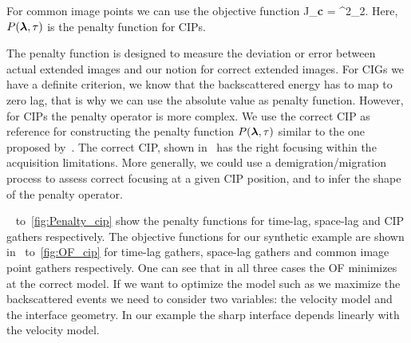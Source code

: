 For common image points we can use the objective function
\beq
J_{\bf c} =   ^2_2.
\eeq
%
Here, $P({\boldsymbol{\lambda}},\tau)$ is the penalty function for CIPs.

The penalty function is designed to measure the deviation or error between actual extended images and our notion for correct 
extended images. For CIGs we have a definite criterion, we know that the backscattered energy has to map
to zero lag, that is why we can use the absolute value as penalty function. However, for CIPs the 
penalty operator is more complex. We use the correct CIP as reference for constructing the penalty function $P({\boldsymbol{\lambda}},\tau)$ similar
to the one proposed by~\citep{tony:cwp12}. The correct CIP, shown in~ has the right focusing within the acquisition limitations.
More generally, we could use a demigration/migration process to assess correct focusing at a given CIP position, and to infer the shape of 
the penalty operator.

~ to~\ref{fig:Penalty_cip} show the penalty functions for time-lag, space-lag and CIP gathers respectively.
The objective functions for our synthetic example are shown in~ to~\ref{fig:OF_cip} for time-lag gathers, space-lag gathers and
common image point gathers respectively. One can see that in all three cases the OF minimizes at the correct model. If we want to optimize the model such as 
we maximize the backscattered events we need to consider two variables: the velocity model and the interface geometry. 
 In our example the sharp interface depends linearly with the velocity model.






